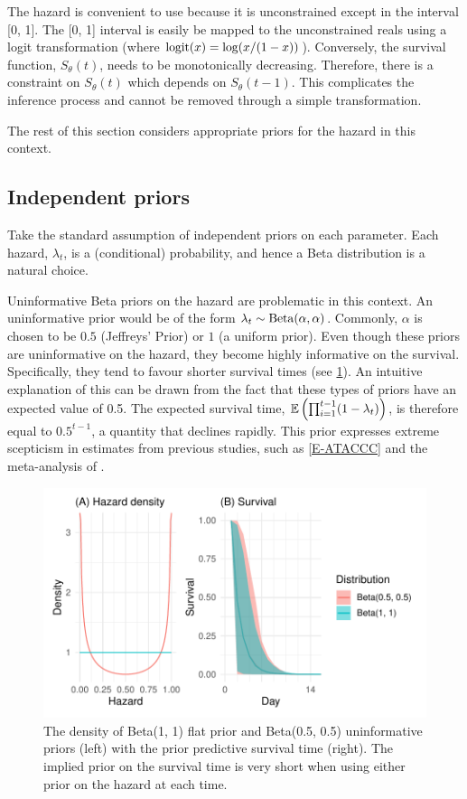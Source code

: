 \documentclass[thesis.tex]{subfiles}
\begin{document}
The hazard is convenient to use because it is unconstrained except in the interval [0, 1].
The [0, 1] interval is easily be mapped to the unconstrained reals using a logit transformation (where $\operatorname{logit}(x) = \log(x/(1-x))$).
Conversely, the survival function, $S_\theta(t)$, needs to be monotonically decreasing.
Therefore, there is a constraint on $S_\theta(t)$ which depends on $S_\theta(t-1)$.
This complicates the inference process and cannot be removed through a simple transformation.

The rest of this section considers appropriate priors for the hazard in this context.

\subsection{Independent priors} \label{perf-test:sec:independent-priors}
Take the standard assumption of independent priors on each parameter.
Each hazard, $\lambda_t$, is a (conditional) probability, and hence a Beta distribution is a natural choice.

Uninformative Beta priors on the hazard are problematic in this context.
An uninformative prior would be of the form $\lambda_t \sim \operatorname{Beta}(\alpha, \alpha)$.
Commonly, $\alpha$ is chosen to be $0.5$ (Jeffreys' Prior) or $1$ (a uniform prior).
Even though these priors are uninformative on the hazard, they become highly informative on the survival. 
Specifically, they tend to favour shorter survival times (see \cref{perf-test:fig:flat-prior}).
An intuitive explanation of this can be drawn from the fact that these types of priors have an expected value of 0.5.
The expected survival time, $\operatorname{\mathbb{E}} \left( \prod_{i=1}^{t-1} (1-\lambda_t) \right)$, is therefore equal to $0.5^{t-1}$, a quantity that declines rapidly.
This prior expresses extreme scepticism in estimates from previous studies, such as \cref{E-ATACCC} and the meta-analysis of \textcite{cevikShedding}.
\begin{figure}
  \centering \includegraphics{cis-perfect-testing/flat-prior}
  \caption[Uninformative priors for the hazard]{The density of Beta(1, 1) flat prior and Beta(0.5, 0.5) uninformative priors (left) with the prior predictive survival time (right). The implied prior on the survival time is very short when using either prior on the hazard at each time. \label{perf-test:fig:flat-prior}}
\end{figure}
\end{document}
